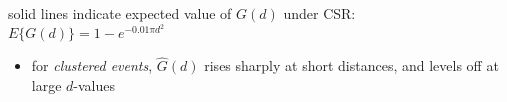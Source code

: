 \documentclass[portrait]{seminar}
\begin{document}
%
%
\begin{slide*}
\begin{center}
 \vspace*{-0.5cm} 
\end{center}

\vspace{0.1cm}
\begin{center}
\begin{figure}
 \hspace{0.5cm}
\end{figure}
\end{center}

\vspace{0.1cm}
\begin{center}
\begin{figure}
\hspace{-0.3cm} 
\hspace{0.5cm}
\end{figure}
\end{center}

\begin{center}
{\small solid lines indicate expected value of $G(d)$ under CSR:
$E\{G(d)\} = 1 - e^{-0.01 \pi d^2 }$ }
\end{center}

\vspace{0.1cm}
\begin{itemize}
\item for {\em clustered events}, $\hat{G}(d)$ rises sharply
at short distances, and levels off at large $d$-values
\end{itemize}

\end{slide*}
\end{document}
